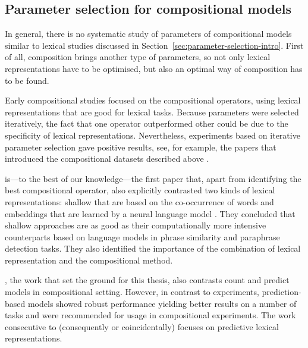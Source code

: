 \subsection{Parameter selection for compositional models}
\label{sec:comp-parameter-selection}

In general, there is no systematic study of parameters of compositional models similar to lexical studies discussed in Section~\ref{sec:parameter-selection-intro}. First of all, composition brings another type of parameters, so not only lexical representations have to be optimised, but also an optimal way of composition has to be found.

Early compositional studies focused on the compositional operators, using lexical representations that are good for lexical tasks. Because parameters were selected iteratively, the fact that one operator outperformed other could be due to the specificity of lexical representations. Nevertheless, experiments based on iterative parameter selection gave positive results, see, for example, the papers that introduced the compositional datasets described above \citet{Grefenstette:2011:ETV:2140490.2140497,kartsaklis-sadrzadeh-pulman:2013:CoNLL-2013}.

\citet{blacoe2012comparison} is---to the best of our knowledge---the first paper that, apart from identifying the best compositional operator, also  explicitly contrasted two kinds of lexical representations: shallow that are based on the co-occurrence of words and embeddings that are learned by a neural language model \cite{bengio2006,Collobert:2008:UAN:1390156.1390177}. They concluded that shallow approaches are as good as their computationally more intensive counterparts based on language models in phrase similarity and paraphrase detection tasks. They also identified the importance of the combination of lexical representation and the compositional method.

\citet{milajevs-EtAl:2014:EMNLP2014}, the work that set the ground for this thesis, %
also contrasts count and predict \cite{baroni-dinu-kruszewski:2014:P14-1} models
in compositional setting. However, in contrast to \citet{blacoe2012comparison} experiments, prediction-based models showed robust performance yielding better results on a number of tasks and were recommended for usage in compositional experiments.
%
%
The work consecutive to \citet{milajevs-EtAl:2014:EMNLP2014} (consequently or coincidentally) focuses on predictive lexical representations.

